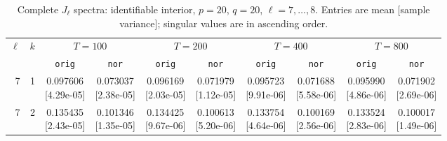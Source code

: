\documentclass[12pt,letterpaper]{article}
\def\spacingset#1{\renewcommand{\baselinestretch}{#1}\small\normalsize}
\theoremstyle{plain}
\theoremstyle{definition}
\begin{document}
\clearpage
\begin{table}[p]
\begingroup
\spacingset{1.0}
\small\centering
\caption{Complete $J_\ell$ spectra: identifiable interior, $p=20$, $q=20$, $\ell=7,\ldots,8$. Entries are mean [sample variance]; singular values are in ascending order.}
\label{s23:lambda:alltab:spectra:p20q20interior:7-8}
\footnotesize
\setlength{\tabcolsep}{2.2pt}
\renewcommand{\arraystretch}{1.03}
\begin{adjustbox}{max width=\linewidth}
\begin{tabular}{@{}rr*{8}{c}@{}}
\toprule
$\ell$ & $k$ & \multicolumn{2}{c}{$T=100$} & \multicolumn{2}{c}{$T=200$} & \multicolumn{2}{c}{$T=400$} & \multicolumn{2}{c}{$T=800$}\\
\cmidrule(lr){3-4}\cmidrule(lr){5-6}\cmidrule(lr){7-8}\cmidrule(lr){9-10}
 &  & \texttt{orig} & \texttt{nor} & \texttt{orig} & \texttt{nor} & \texttt{orig} & \texttt{nor} & \texttt{orig} & \texttt{nor}\\
\midrule
7 & 1 & \shortstack{0.097606\\[-1pt]{\scriptsize[4.29e-05]}} & \shortstack{0.073037\\[-1pt]{\scriptsize[2.38e-05]}} & \shortstack{0.096169\\[-1pt]{\scriptsize[2.03e-05]}} & \shortstack{0.071979\\[-1pt]{\scriptsize[1.12e-05]}} & \shortstack{0.095723\\[-1pt]{\scriptsize[9.91e-06]}} & \shortstack{0.071688\\[-1pt]{\scriptsize[5.58e-06]}} & \shortstack{0.095990\\[-1pt]{\scriptsize[4.86e-06]}} & \shortstack{0.071902\\[-1pt]{\scriptsize[2.69e-06]}}\\
7 & 2 & \shortstack{0.135435\\[-1pt]{\scriptsize[2.43e-05]}} & \shortstack{0.101346\\[-1pt]{\scriptsize[1.35e-05]}} & \shortstack{0.134425\\[-1pt]{\scriptsize[9.67e-06]}} & \shortstack{0.100613\\[-1pt]{\scriptsize[5.20e-06]}} & \shortstack{0.133754\\[-1pt]{\scriptsize[4.64e-06]}} & \shortstack{0.100169\\[-1pt]{\scriptsize[2.56e-06]}} & \shortstack{0.133524\\[-1pt]{\scriptsize[2.83e-06]}} & \shortstack{0.100017\\[-1pt]{\scriptsize[1.49e-06]}}\\

\end{tabular}
\end{adjustbox}
\end{table}
\end{document}
